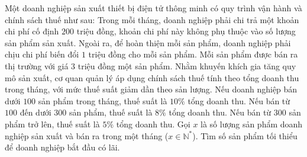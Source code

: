 \begin{ex}%
	Một doanh nghiệp sản xuất thiết bị điện tử thông minh có quy trình vận hành và chính sách thuế như sau: Trong mỗi tháng, doanh nghiệp phải chi trả một khoản chi phí cố định $200$ triệu đồng, khoản chi phí này không phụ thuộc vào số lượng sản phẩm sản xuất. Ngoài ra, để hoàn thiện mỗi sản phẩm, doanh nghiệp phải chịu chi phí biến đổi $1$ triệu đồng cho mỗi sản phẩm. Mỗi sản phẩm được bán ra thị trường với giá $3$ triệu đồng một sản phẩm. Nhằm khuyến khích gia tăng quy mô sản xuất, cơ quan quản lý áp dụng chính sách thuế tính theo tổng doanh thu trong tháng, với mức thuế suất giảm dần theo sản lượng. Nếu doanh nghiệp bán dưới $100$ sản phẩm trong tháng, thuế suất là $10\%$ tổng doanh thu. Nếu bán từ $100$ đến dưới $300$ sản phẩm, thuế suất là $8\%$ tổng doanh thu. Nếu bán từ $300$ sản phẩm trở lên, thuế suất là $5\%$ tổng doanh thu. Gọi $x$ là số lượng sản phẩm doanh nghiệp sản xuất và bán ra trong một tháng ($x\in\mathbb{N}^*$). Tìm số sản phẩm tối thiểu để doanh nghiệp bắt đầu có lãi.
\par{}
\end{ex}

